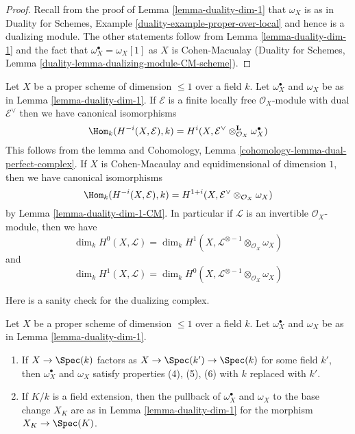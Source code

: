 \begin{proof}
Recall from the proof of Lemma \ref{lemma-duality-dim-1}
that $\omega_X$ is as in Duality for Schemes, Example
\ref{duality-example-proper-over-local} and hence is
a dualizing module. The other statements follow from
Lemma \ref{lemma-duality-dim-1}
and the fact that $\omega_X^\bullet = \omega_X[1]$
as $X$ is Cohen-Macualay (Duality for Schemes, Lemma
\ref{duality-lemma-dualizing-module-CM-scheme}).
\end{proof}

\begin{remark}
\label{remark-rework-duality-locally-free}
Let $X$ be a proper scheme of dimension $\leq 1$ over a field $k$.
Let $\omega_X^\bullet$ and $\omega_X$ be as in Lemma \ref{lemma-duality-dim-1}.
If $\mathcal{E}$ is a finite locally free $\mathcal{O}_X$-module
with dual $\mathcal{E}^\vee$ then we have canonical isomorphisms
$$
\Hom_k(H^{-i}(X, \mathcal{E}), k) =
H^i(X, \mathcal{E}^\vee \otimes_{\mathcal{O}_X}^\mathbf{L} \omega_X^\bullet)
$$
This follows from the lemma and
Cohomology, Lemma \ref{cohomology-lemma-dual-perfect-complex}.
If $X$ is Cohen-Macaulay and equidimensional of dimension $1$, then
we have canonical isomorphisms
$$
\Hom_k(H^{-i}(X, \mathcal{E}), k) =
H^{1 + i}(X, \mathcal{E}^\vee \otimes_{\mathcal{O}_X} \omega_X)
$$
by Lemma \ref{lemma-duality-dim-1-CM}. In particular
if $\mathcal{L}$ is an invertible $\mathcal{O}_X$-module, then we have
$$
\dim_k H^0(X, \mathcal{L}) =
\dim_k H^1(X, \mathcal{L}^{\otimes -1} \otimes_{\mathcal{O}_X} \omega_X)
$$
and
$$
\dim_k H^1(X, \mathcal{L}) =
\dim_k H^0(X, \mathcal{L}^{\otimes -1} \otimes_{\mathcal{O}_X} \omega_X)
$$
\end{remark}

\noindent
Here is a sanity check for the dualizing complex.

\begin{lemma}
\label{lemma-sanity-check-duality}
Let $X$ be a proper scheme of dimension $\leq 1$ over a field $k$.
Let $\omega_X^\bullet$ and $\omega_X$ be as in Lemma \ref{lemma-duality-dim-1}.
\begin{enumerate}
\item If $X \to \Spec(k)$ factors as $X \to \Spec(k') \to \Spec(k)$
for some field $k'$, then $\omega_X^\bullet$ and $\omega_X$
satisfy properties (4), (5), (6) with $k$ replaced with $k'$.
\item If $K/k$ is a field extension, then the pullback of
$\omega_X^\bullet$ and $\omega_X$ to the base change $X_K$
are as in  Lemma \ref{lemma-duality-dim-1} for the morphism
$X_K \to \Spec(K)$.
\end{enumerate}
\end{lemma}

